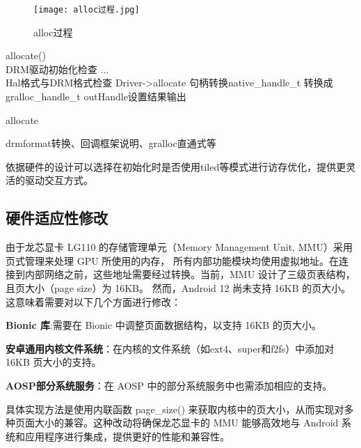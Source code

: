 \begin{figure}[h]
  \centering
  \texttt{[image: alloc过程.jpg]}
  \caption{alloc过程}
  \label{fig:alloc过程}
\end{figure}

\begin{algorithm}[H]
  \SetAlgoLined
  allocate(){\\
  DRM驱动初始化检查\;
  ... \\
  Hal格式与DRM格式检查\;
  Driver->allocate\;   
  句柄转换native\_handle\_t 转换成gralloc\_handle\_t\;
  outHandle设置结果输出\;
  }
  \caption{allocate}
  \label{algo:allocate}
\end{algorithm}

drmformat转换、回调框架说明、gralloc直通式等

依据硬件的设计可以选择在初始化时是否使用tiled等模式进行访存优化，提供更灵活的驱动交互方式。

\subsection{硬件适应性修改}
由于龙芯显卡 LG110 的存储管理单元（Memory Management Unit, MMU）采用页式管理来处理 GPU 所使用的内存，
所有内部功能模块均使用虚拟地址。在连接到内部网络之前，这些地址需要经过转换。当前，MMU 设计了三级页表结构，且页大小（page size）为 16KB。
然而，Android 12 尚未支持 16KB 的页大小。这意味着需要对以下几个方面进行修改：

\textbf{Bionic 库}:需要在 Bionic 中调整页面数据结构，以支持 16KB 的页大小。

\textbf{安卓通用内核文件系统}：在内核的文件系统（如ext4、super和f2fs）中添加对 16KB 页大小的支持。

\textbf{AOSP部分系统服务}：在 AOSP 中的部分系统服务中也需添加相应的支持。

具体实现方法是使用内联函数 page\_size() 来获取内核中的页大小，从而实现对多种页面大小的兼容。这种改动将确保龙芯显卡的 MMU 
能够高效地与 Android 系统和应用程序进行集成，提供更好的性能和兼容性。


